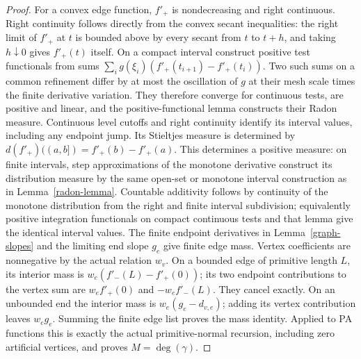\documentclass[11pt]{article}
\begin{document}
\begin{proof}
For a convex edge function, $f'_+$ is nondecreasing and right continuous.
Right continuity follows directly from the convex secant inequalities:
the right limit of $f'_+$ at $t$ is bounded above by every secant from
$t$ to $t+h$, and taking $h\downarrow0$ gives $f'_+(t)$ itself.
On a compact interval construct positive test functionals from sums
$\sum_i g(\xi_i)(f'_+(t_{i+1})-f'_+(t_i))$.
Two such sums on a common refinement differ by at most the oscillation
of $g$ at their mesh scale times the finite derivative variation.
They therefore converge for continuous tests, are positive and linear,
and the positive-functional lemma constructs their Radon measure.
Continuous level cutoffs and right continuity identify its interval
values, including any endpoint jump. Its Stieltjes measure is determined by
$d(f'_+)((a,b])=f'_+(b)-f'_+(a)$. This determines a positive measure:
on finite intervals, step approximations of the monotone derivative
construct its distribution measure by the same open-set or monotone
interval construction as in Lemma~\ref{radon-lemma}. Countable additivity
follows by continuity of the monotone distribution from the right and
finite interval subdivision; equivalently positive integration functionals
on compact continuous tests and that lemma give the identical interval
values. The finite endpoint derivatives in Lemma~\ref{graph-slopes}
and the limiting end slope $g_e$ give finite edge mass.
Vertex coefficients are nonnegative by the actual relation $w_v$.
On a bounded edge of primitive length $L$, its interior mass is
$w_e(f'_-(L)-f'_+(0))$; its two endpoint contributions to the vertex
sum are $w_ef'_+(0)$ and $-w_ef'_-(L)$. They cancel exactly.
On an unbounded end the interior mass is $w_e(g_e-d_{v,e})$;
adding its vertex contribution leaves $w_eg_e$. Summing the finite
edge list proves the mass identity. Applied to PA functions this is
exactly the actual primitive-normal recursion, including zero artificial
vertices, and proves $M=\deg(\gamma)$.


\end{proof}
\end{document}
